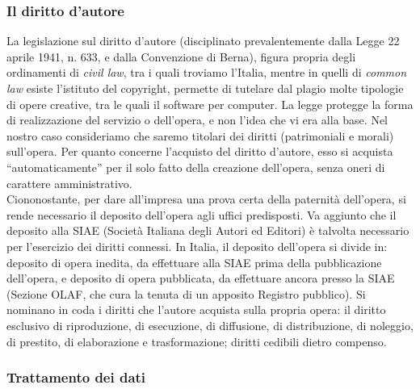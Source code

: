 \subsubsection{Il diritto d'autore}
La legislazione sul diritto d'autore (disciplinato prevalentemente dalla Legge 22 aprile 1941, n. 633, e dalla Convenzione di Berna), figura propria degli ordinamenti di \textit{civil law}, tra i quali troviamo l'Italia, mentre in quelli di \textit{common law} esiste l'istituto del copyright, permette di tutelare dal plagio molte tipologie di opere creative, tra le quali il software per computer. La legge protegge la forma di realizzazione del servizio o dell'opera, e non l'idea che vi era alla base. Nel nostro caso consideriamo che saremo titolari dei diritti (patrimoniali e morali) sull'opera. Per quanto concerne l'acquisto del diritto d'autore, esso si acquista ``automaticamente'' per il solo fatto della creazione dell'opera, senza oneri di carattere amministrativo.\\
Ciononostante, per dare all'impresa una prova certa della paternità dell'opera, si rende necessario il deposito dell'opera agli uffici predisposti. Va aggiunto che il deposito alla SIAE (Società Italiana degli Autori ed Editori) è talvolta necessario per l'esercizio dei diritti connessi. In Italia, il deposito dell'opera si divide in: deposito di opera inedita, da effettuare alla SIAE prima della pubblicazione dell'opera, e deposito di opera pubblicata, da effettuare ancora presso la SIAE (Sezione OLAF, che cura la tenuta di un apposito Registro pubblico). Si nominano in coda i diritti che l'autore acquista sulla propria opera: il diritto esclusivo di riproduzione, di esecuzione, di diffusione, di distribuzione, di noleggio, di prestito, di elaborazione e trasformazione; diritti cedibili dietro compenso.

\subsubsection{Trattamento dei dati}
